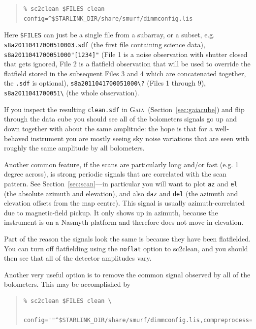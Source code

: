 \documentclass[twoside,11pt]{article}
\newcommand{\htmlref}[2]{#1}
\newcommand{\latexhtml}[2]{#1}
\newcommand{\xref}[3]{#1}
\renewcommand{\_}{\texttt{\symbol{95}}}
\newenvironment{myquote}{
   \color{MidnightBlue}\begin{quote}\begin{small}}{
   \end{small}\end{quote}
}
\newcommand{\gaia}{\xref{\textsc{Gaia}}{sun214}{}}
\newcommand{\task}[1]{\textsf{#1}}
\newcommand{\param}[1]{\texttt{#1}}
\newcommand{\file}[1]{\texttt{#1}}
\newcommand{\cref}[3]{\latexhtml{#1~\ref{#2}}{\htmlref{#3}{#2}}}
\renewenvironment{myquote}{
      \begin{quote}\begin{small}}{
      \end{small}\end{quote}
   }
\begin{document}
\begin{myquote}
\begin{verbatim}
% sc2clean $FILES clean config=^$STARLINK_DIR/share/smurf/dimmconfig.lis
\end{verbatim}
\end{myquote}

Here \file{\$FILES} can just be a single file from a subarray, or a
subset, e.g. \file{s8a20110417\_00051\_0003.sdf} (the first file
containing science data), \file{s8a20110417\_00051\_000"[1234]"}
(File 1 is a noise observation with shutter closed that gets ignored,
File 2 is a flatfield observation that will be used to override the
flatfield stored in the subsequent Files 3 and 4 which are
concatenated together, the \file{.sdf} is optional),
\file{s8a20110417\_00051\_000\textbackslash?} (Files 1 through 9),
\file{s8a20110417\_00051\_\textbackslash*} (the whole observation).

If you inspect the resulting \file{clean.sdf} in \gaia\
(\cref{Section}{sec:gaiacube}{Displaying time-series data}) and flip
through the data cube you should
see all of the bolometers signals go up and down together with about
the same amplitude: the hope is that for a well-behaved instrument you
are mostly seeing sky noise variations that are seen with roughly the
same amplitude by all bolometers.

Another common feature, if the scans are particularly long and/or fast
(e.g. 1\,degree across), is strong periodic signals that are correlated
with the scan pattern. See \cref{Section}{sec:scan}{Displaying scan
patterns}---in particular
you will want to plot \texttt{az} and \texttt{el} (the absolute
azimuth and elevation), and also \texttt{daz} and \texttt{del} (the
azimuth and elevation offsets from the map centre). This signal is
usually azimuth-correlated due to magnetic-field pickup. It only shows
up in azimuth, because the instrument is on a Nasmyth platform and
therefore does not move in elevation.

Part of the reason the signals look the same is because they have been
flatfielded. You can turn off flatfielding using the \param{noflat}
option to \task{sc2clean}, and you should then see that all of the detector
amplitudes vary.

Another very useful option is to remove the common signal observed by
all of the bolometers. This may be accomplished by

\begin{myquote}
\begin{verbatim}
% sc2clean $FILES clean \
   config='"^$STARLINK_DIR/share/smurf/dimmconfig.lis,compreprocess=1"'
\end{verbatim}
\end{myquote}
\end{document}
